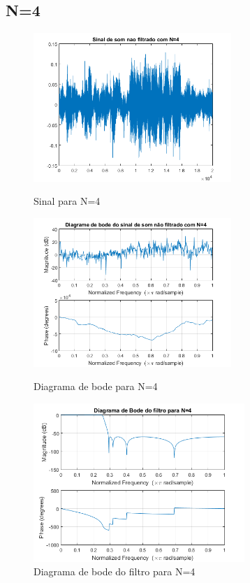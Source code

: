 \documentclass[11pt]{article}
\begin{document}
\subsection{N=4}
\begin{figure}[h]
\begin{center}
\begin{minipage}[b]{0.45\linewidth}
\includegraphics[width=7.5cm]{nfds4.png}
\caption{Sinal para N=4}
\label{figura8}
\end{minipage}
\begin{minipage}[b]{0.45\linewidth}
\includegraphics[width=7.5cm]{nfdb4.png}
\caption{Diagrama de bode para N=4}
\label{figura9}
\end{minipage}
\newline
\newline
\includegraphics[width=8cm]{filtro4.png}
\caption{Diagrama de bode do filtro para N=4}
\label{figura10}
\end{center}
\end{figure}
\end{document}
